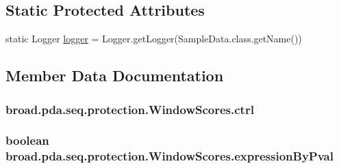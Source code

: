 \subsection*{Static Protected Attributes}
\begin{DoxyCompactItemize}
\item 
static Logger \hyperlink{classbroad_1_1pda_1_1seq_1_1protection_1_1_window_scores_af0e533777e4578717554e97ab7b8a1ad}{logger} = Logger.\+get\+Logger(Sample\+Data.\+class.\+get\+Name())
\end{DoxyCompactItemize}


\subsection{Member Data Documentation}
\hypertarget{classbroad_1_1pda_1_1seq_1_1protection_1_1_window_scores_adbea63ef3f80374592309593aff3eeac}{
\subsubsection[{ctrl}]{ broad.\+pda.\+seq.\+protection.\+Window\+Scores.\+ctrl\hspace{0.3cm}{\ttfamily [protected]}}}\label{classbroad_1_1pda_1_1seq_1_1protection_1_1_window_scores_adbea63ef3f80374592309593aff3eeac}
\hypertarget{classbroad_1_1pda_1_1seq_1_1protection_1_1_window_scores_aa39e5bcacff6e7020237153e53d2002a}{
\subsubsection[{expression\+By\+Pval}]{\setlength{\rightskip}{0pt plus 5cm}boolean broad.\+pda.\+seq.\+protection.\+Window\+Scores.\+expression\+By\+Pval\hspace{0.3cm}{\ttfamily [protected]}}}\label{classbroad_1_1pda_1_1seq_1_1protection_1_1_window_scores_aa39e5bcacff6e7020237153e53d2002a}
